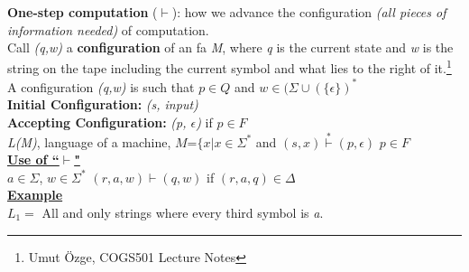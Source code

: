 \documentclass[12pt,a4paper]{article}
\begin{document}
{\noindent \textbf{One-step computation} ($\vdash$): how we advance the configuration \emph{(all pieces of information needed)} of computation.\\
Call \emph{(q,w)} a \textbf{configuration} of an fa \emph{M}, where \emph{q} is the current state and \emph{w} is the string on the tape including the current symbol and what lies to the right of it.\footnote{Umut Özge, COGS501 Lecture Notes}\\

A configuration \emph{(q,w)} is such that $p \in Q$ and $w \in (\Sigma \cup (\lbrace \epsilon \rbrace)^{*}$\\

\noindent \textbf{Initial Configuration:} \emph{(s, input)}\\
\textbf{Accepting Configuration:} \emph{(p, $\epsilon$)} if $p \in F$\\

\emph{L(M)}, language of a machine, $M$=$\lbrace x|x \in \Sigma^{*}$ and $(s,x)\overset{*}{\vdash}(p,\epsilon)$ $p \in F$\\

\underline{\textbf{Use of ``$\vdash$"}}\\
$a \in \Sigma$, $w\in \Sigma^{*}$ $(r, a, w)\vdash (q,w)$ if $(r,a,q)\in \Delta $\\

\underline{\textbf{Example}}\\
$L_{1}=$ All and only strings where every third symbol is \emph{a}.\\

}
\end{document}
